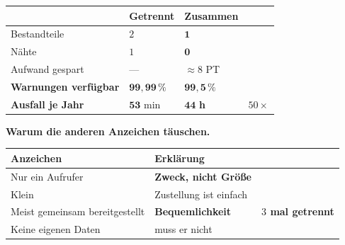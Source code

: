\begin{merksatz}
\begin{center}
{\small
\renewcommand{\arraystretch}{1.45}
\begin{tabular}{@{}P{2.8cm}P{2.2cm}P{2.4cm}P{1.8cm}@{}}
\toprule
& \textbf{Getrennt} & \textbf{Zusammen} & \\
\midrule
Bestandteile & $2$ & $\mathbf{1}$ & \\
Nähte & $1$ & $\mathbf{0}$ & \\
Aufwand gespart & --- & \textcolor{gruen}{$\approx8$ PT} & \\
\textbf{Warnungen verfügbar} & \textcolor{gruen}{$\mathbf{99{,}99\,\%}$} & \textcolor{akzent}{$\mathbf{99{,}5\,\%}$} & \\
\textbf{Ausfall je Jahr} & \textcolor{gruen}{$\mathbf{53}$ min} & \textcolor{akzent}{$\mathbf{44}$ \textbf{h}} & $50\times$\\
\bottomrule
\end{tabular}}
\end{center}

\begin{center}
\begin{minipage}{0.88\textwidth}
\end{minipage}
\end{center}

\textbf{Warum die anderen Anzeichen täuschen.}

\begin{center}
\renewcommand{\arraystretch}{1.45}
\begin{tabular}{@{}P{3.0cm}P{2.6cm}P{2.2cm}@{}}
\toprule
\textbf{Anzeichen} & \textbf{Erklärung} & \\
\midrule
Nur ein Aufrufer & \textbf{Zweck, nicht Größe} & \\
Klein & \textcolor{gruen}{Zustellung ist einfach} & \\
Meist gemeinsam bereitgestellt & \textbf{Bequem\-lichkeit} & \textcolor{gruen}{\textbf{$3$ mal getrennt}}\\
Keine eigenen Daten & \textcolor{gruen}{muss er nicht} & \\
\bottomrule
\end{tabular}
\end{center}

\begin{center}
\end{center}
\end{merksatz}

